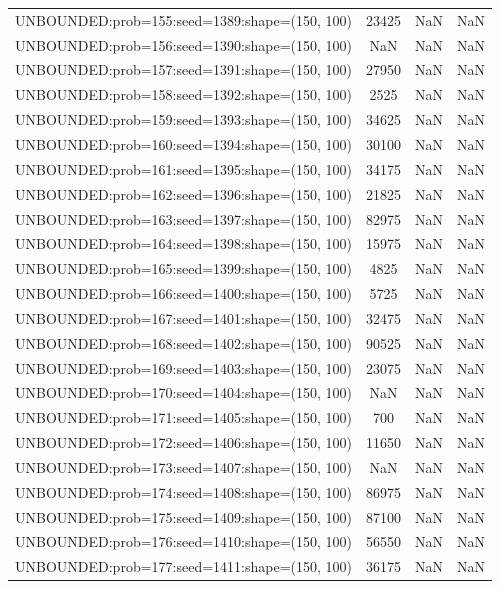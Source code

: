 \begin{longtable}{lccc}
UNBOUNDED:prob=155:seed=1389:shape=(150, 100) & 23425 &   NaN &    NaN \\
UNBOUNDED:prob=156:seed=1390:shape=(150, 100) &   NaN &   NaN &    NaN \\
UNBOUNDED:prob=157:seed=1391:shape=(150, 100) & 27950 &   NaN &    NaN \\
UNBOUNDED:prob=158:seed=1392:shape=(150, 100) &  2525 &   NaN &    NaN \\
UNBOUNDED:prob=159:seed=1393:shape=(150, 100) & 34625 &   NaN &    NaN \\
UNBOUNDED:prob=160:seed=1394:shape=(150, 100) & 30100 &   NaN &    NaN \\
UNBOUNDED:prob=161:seed=1395:shape=(150, 100) & 34175 &   NaN &    NaN \\
UNBOUNDED:prob=162:seed=1396:shape=(150, 100) & 21825 &   NaN &    NaN \\
UNBOUNDED:prob=163:seed=1397:shape=(150, 100) & 82975 &   NaN &    NaN \\
UNBOUNDED:prob=164:seed=1398:shape=(150, 100) & 15975 &   NaN &    NaN \\
UNBOUNDED:prob=165:seed=1399:shape=(150, 100) &  4825 &   NaN &    NaN \\
UNBOUNDED:prob=166:seed=1400:shape=(150, 100) &  5725 &   NaN &    NaN \\
UNBOUNDED:prob=167:seed=1401:shape=(150, 100) & 32475 &   NaN &    NaN \\
UNBOUNDED:prob=168:seed=1402:shape=(150, 100) & 90525 &   NaN &    NaN \\
UNBOUNDED:prob=169:seed=1403:shape=(150, 100) & 23075 &   NaN &    NaN \\
UNBOUNDED:prob=170:seed=1404:shape=(150, 100) &   NaN &   NaN &    NaN \\
UNBOUNDED:prob=171:seed=1405:shape=(150, 100) &   700 &   NaN &    NaN \\
UNBOUNDED:prob=172:seed=1406:shape=(150, 100) & 11650 &   NaN &    NaN \\
UNBOUNDED:prob=173:seed=1407:shape=(150, 100) &   NaN &   NaN &    NaN \\
UNBOUNDED:prob=174:seed=1408:shape=(150, 100) & 86975 &   NaN &    NaN \\
UNBOUNDED:prob=175:seed=1409:shape=(150, 100) & 87100 &   NaN &    NaN \\
UNBOUNDED:prob=176:seed=1410:shape=(150, 100) & 56550 &   NaN &    NaN \\
UNBOUNDED:prob=177:seed=1411:shape=(150, 100) & 36175 &   NaN &    NaN \\

\end{longtable}
